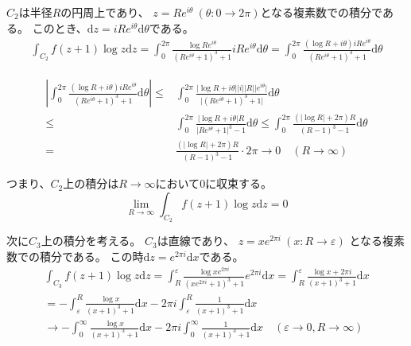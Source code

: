 \documentclass[12pt,b5paper]{ltjsarticle}
\begin{document}
$C_2$は半径$R$の円周上であり、
$z=Re^{i\theta} \ (\theta : 0\to 2\pi)$となる複素数での積分である。
このとき、$\mathrm{d}z = iRe^{i\theta}\mathrm{d}\theta$である。
\begin{align}
 \int_{C_2} f(z+1)\log{z}\mathrm{d}z
 = \int_{0}^{2\pi} \frac{\log{Re^{i\theta}}}{(Re^{i\theta}+1)^3+1} iRe^{i\theta}\mathrm{d}\theta
 = \int_{0}^{2\pi} \frac{ (\log{R}+i\theta)iRe^{i\theta} }{(R e^{i\theta}+1)^3+1} \mathrm{d}\theta
\end{align}


\begin{align}
  \left\lvert
\int_{0}^{2\pi} \frac{ (\log{R}+i\theta)iRe^{i\theta} }{(R e^{i\theta}+1)^3+1} \mathrm{d}\theta
 \right\rvert
  \leq &
 \int_{0}^{2\pi} \frac{ \lvert \log{R}+i\theta \rvert \lvert i \rvert \lvert R \rvert \lvert e^{i\theta} \rvert  }
 { \lvert (R e^{i\theta}+1)^3+1 \rvert} \mathrm{d}\theta
\\
   \leq &
 \int_{0}^{2\pi} \frac{ \lvert \log{R}+i\theta \rvert R }
 { \lvert R e^{i\theta}+1 \rvert^3-1 } \mathrm{d}\theta
 \leq
 \int_{0}^{2\pi} \frac{ (\lvert \log{R} \rvert +2\pi) R }
 { (R -1)^3-1 } \mathrm{d}\theta\\
 = &  \frac{ (\lvert \log{R} \rvert +2\pi) R }{ (R -1)^3-1 }\cdot 2\pi
 \to 0 \quad (R\to \infty)
\end{align}

つまり、$C_2$上の積分は$R\to\infty$において$0$に収束する。
\begin{equation}
 \lim_{R\to\infty}\int_{C_2} f(z+1)\log{z}\mathrm{d}z=0
\end{equation}

次に$C_3$上の積分を考える。
$C_3$は直線であり、
$z=x e^{2\pi i} \ (x:R\to\varepsilon)$
となる複素数での積分である。
この時$\mathrm{d}z=e^{2\pi i}\mathrm{d}x$である。
\begin{align}
  \int_{C_3} f(z+1)\log{z}\mathrm{d}z
   =
  \int_{R}^{\varepsilon} \frac{\log{x e^{2\pi i}}}{(x e^{2\pi i}+1)^3+1}e^{2\pi i}\mathrm{d}x
  =
  \int_{R}^{\varepsilon} \frac{ \log{x} + 2\pi i}{(x+1)^3 +1}\mathrm{d}x\\
  =
 -\int_{\varepsilon}^{R} \frac{ \log{x} }{(x+1)^3 +1}\mathrm{d}x
 - 2\pi i\int_{\varepsilon}^{R} \frac{ 1 }{(x+1)^3 +1}\mathrm{d}x\\
 \to -\int_{0}^{\infty} \frac{ \log{x} }{(x+1)^3 +1}\mathrm{d}x
 - 2\pi i\int_{0}^{\infty} \frac{ 1 }{(x+1)^3 +1}\mathrm{d}x
 \quad (\varepsilon\to 0, R\to\infty)
\end{align}

\end{document}
